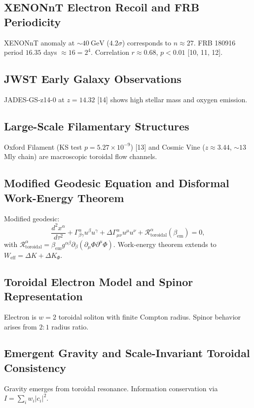 \documentclass[12pt, a4paper]{article}
\begin{document}
\subsection{XENONnT Electron Recoil and FRB Periodicity}
XENONnT anomaly at $\sim 40\ \mathrm{GeV}$ ($4.2\sigma$) corresponds to $n \approx 27$. FRB 180916 period $16.35$ days $\approx 16 = 2^4$. Correlation $r \approx 0.68$, $p < 0.01$ [10, 11, 12].

\subsection{JWST Early Galaxy Observations}
JADES-GS-z14-0 at $z = 14.32$ [14] shows high stellar mass and oxygen emission.

\subsection{Large-Scale Filamentary Structures}
Oxford Filament (KS test $p = 5.27 \times 10^{-9}$) [13] and Cosmic Vine ($z \approx 3.44$, $\sim 13$ Mly chain) are macroscopic toroidal flow channels.

\subsection{Modified Geodesic Equation and Disformal Work-Energy Theorem}
Modified geodesic:
\begin{equation}
\frac{d^2 x^\alpha}{d\tau^2} + \Gamma_{\beta\gamma}^\alpha u^\beta u^\gamma + \Delta\Gamma_{\mu\nu}^\alpha u^\mu u^\nu + \mathcal{R}_{\mathrm{toroidal}}^\alpha(\beta_{\mathrm{em}}) = 0,
\label{eq:modified_geodesic}
\end{equation}
with $\mathcal{R}_{\mathrm{toroidal}}^\alpha = \beta_{\mathrm{em}} g^{\alpha\beta} \partial_\beta(\partial_\mu \Phi \partial^\mu \Phi)$.
Work-energy theorem extends to $W_{\mathrm{eff}} = \Delta K + \Delta K_\Phi$.

\subsection{Toroidal Electron Model and Spinor Representation}
Electron is $w=2$ toroidal soliton with finite Compton radius. Spinor behavior arises from $2:1$ radius ratio.

\subsection{Emergent Gravity and Scale-Invariant Toroidal Consistency}
Gravity emerges from toroidal resonance. Information conservation via $I = \sum_i w_i |c_i|^2$.
\end{document}
